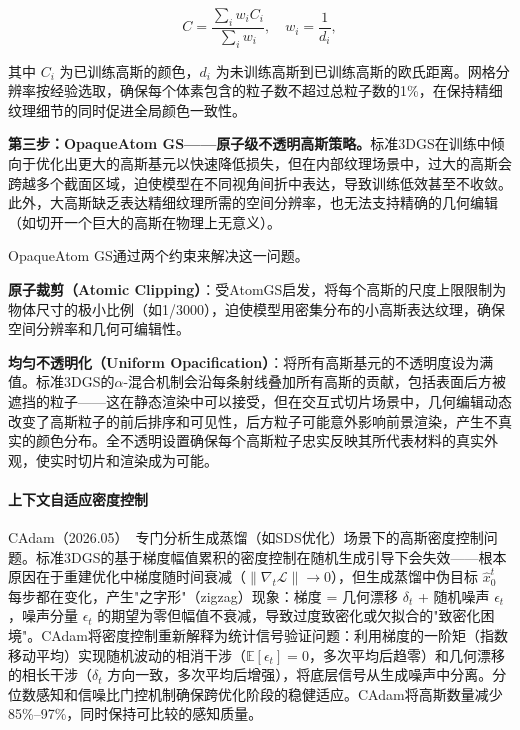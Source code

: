 \begin{equation}
C = \frac{\sum_i w_i C_i}{\sum_i w_i}, \quad w_i = \frac{1}{d_i},
\end{equation}

其中 $C_i$ 为已训练高斯的颜色，$d_i$ 为未训练高斯到已训练高斯的欧氏距离。网格分辨率按经验选取，确保每个体素包含的粒子数不超过总粒子数的1\%，在保持精细纹理细节的同时促进全局颜色一致性。

\textbf{第三步：OpaqueAtom GS——原子级不透明高斯策略。}标准3DGS在训练中倾向于优化出更大的高斯基元以快速降低损失，但在内部纹理场景中，过大的高斯会跨越多个截面区域，迫使模型在不同视角间折中表达，导致训练低效甚至不收敛。此外，大高斯缺乏表达精细纹理所需的空间分辨率，也无法支持精确的几何编辑（如切开一个巨大的高斯在物理上无意义）。

OpaqueAtom GS通过两个约束来解决这一问题。

\textbf{原子裁剪（Atomic Clipping）}：受AtomGS启发，将每个高斯的尺度上限限制为物体尺寸的极小比例（如1/3000），迫使模型用密集分布的小高斯表达纹理，确保空间分辨率和几何可编辑性。

\textbf{均匀不透明化（Uniform Opacification）}：将所有高斯基元的不透明度设为满值。标准3DGS的$\alpha$-混合机制会沿每条射线叠加所有高斯的贡献，包括表面后方被遮挡的粒子——这在静态渲染中可以接受，但在交互式切片场景中，几何编辑动态改变了高斯粒子的前后排序和可见性，后方粒子可能意外影响前景渲染，产生不真实的颜色分布。全不透明设置确保每个高斯粒子忠实反映其所代表材料的真实外观，使实时切片和渲染成为可能。

\paragraph{上下文自适应密度控制}

CAdam（2026.05）~\cite{2605_20872}专门分析生成蒸馏（如SDS优化）场景下的高斯密度控制问题。标准3DGS的基于梯度幅值累积的密度控制在随机生成引导下会失效——根本原因在于重建优化中梯度随时间衰减（$\|\nabla_t \mathcal{L}\| \to 0$），但生成蒸馏中伪目标 $\hat{x}_0^t$ 每步都在变化，产生"之字形"（zigzag）现象：梯度 = 几何漂移 $\delta_t$ + 随机噪声 $\epsilon_t$，噪声分量 $\epsilon_t$ 的期望为零但幅值不衰减，导致过度致密化或欠拟合的"致密化困境"。CAdam将密度控制重新解释为统计信号验证问题：利用梯度的一阶矩（指数移动平均）实现随机波动的相消干涉（$\mathbb{E}[\epsilon_t]=0$，多次平均后趋零）和几何漂移的相长干涉（$\delta_t$ 方向一致，多次平均后增强），将底层信号从生成噪声中分离。分位数感知和信噪比门控机制确保跨优化阶段的稳健适应。CAdam将高斯数量减少85\%--97\%，同时保持可比较的感知质量。

